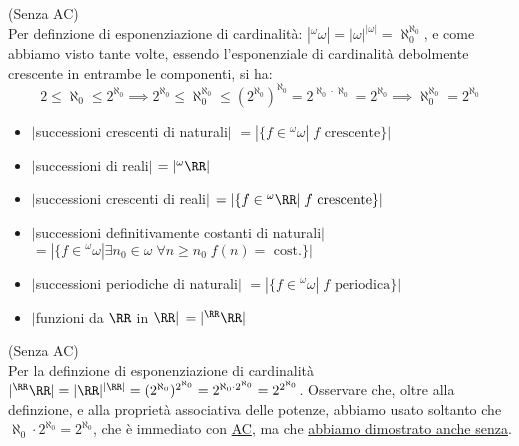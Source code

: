 \documentclass[11pt]{scrartcl}
\begin{document}
\begin{soln}
	(Senza AC)\\
	Per definzione di esponenziazione di cardinalità: $|{}^\omega \omega| = |\omega|^{|\omega|} = \aleph_0^{\aleph_0}$, e come abbiamo visto tante volte, essendo l'esponenziale di cardinalità debolmente crescente in entrambe le componenti, si ha:
	\[ 2 \leq \aleph_0 \leq 2^{\aleph_0} \implies 2^{\aleph_0} \leq \aleph_0^{\aleph_0} \leq (2^{\aleph_0})^{\aleph_0} = 2^{\aleph_0 \cdot \aleph_0} = 2^{\aleph_0} \implies \aleph_0^{\aleph_0} = 2^{\aleph_0}
		\]
\end{soln}

\begin{itemize}
	\item $|$successioni crescenti di naturali$|$ $= |\{f \in {}^\omega \omega | \; \text{$f$ crescente}\}|$
\end{itemize}

\begin{itemize}
	\item $|$successioni di reali$|$ $= |{}^\omega \RR|$
\end{itemize}

\begin{itemize}
	\item $|$successioni crescenti di reali$|$ $= |\{f \in {}^\omega \RR | \; \text{$f$ crescente}\}|$
\end{itemize}

\begin{itemize}
	\item $|$successioni definitivamente costanti di naturali$|$ $= |\{f \in {}^\omega \omega | \exists n_0 \in \omega \; \forall n \geq n_0 \; \text{$f(n) =$ cost.}\}|$
\end{itemize}

\begin{itemize}
	\item $|$successioni periodiche di naturali$|$ $= |\{f \in {}^\omega \omega | \;\text{$f$ periodica}\}|$
\end{itemize}

\begin{itemize}
	\item $|$funzioni da $\RR$ in $\RR|$ $= |{}^\RR\RR|$
\end{itemize}

\begin{soln}
	(Senza AC)\\
	Per la definzione di esponenziazione di cardinalità $|{}^\RR\RR| = |\RR|^{|\RR|} = (2^{\aleph_0})^{2^{\aleph_0}} = 2^{\aleph_0 \cdot 2^{\aleph_0}} = 2^{2^{\aleph_0}}$. Osservare che, oltre alla definzione,
	e alla proprietà associativa delle potenze, abbiamo usato soltanto che $\aleph_0 \cdot 2^{\aleph_0} = 2^{\aleph_0}$, che è immediato con \hyperref[ax9]{AC}, ma che \hyperref[prodotto_cardinali_senza_AC]{abbiamo dimostrato anche senza}.
\end{soln}
\end{document}

